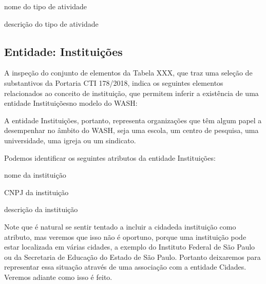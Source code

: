 \documentclass[
12pt,		%
openright,	%
twoside,  %
a4paper,			%
chapter=TITLE,		%
english,			%
french,				%
spanish,			%
brazil				%
]{USPSC-classe/USPSC}
\begin{document}
\begin{alineas}
\item nome do tipo de atividade
\item descri\c{c}\~ao do tipo de atividade
\end{alineas}

\subsection[Entidade: Institui\c{c}\~oes]{Entidade: Institui\c{c}\~oes}\label{Entidade: Institui\c{c}\~oes}
A inspe\c{c}\~ao do conjunto de elementos da Tabela XXX, que traz uma sele\c{c}\~ao de substantivos da Portaria CTI 178/2018, indica os seguintes elementos relacionados ao conceito de \textquotedbl institui\c{c}\~ao\textquotedbl , que permitem inferir a exist\^encia de uma entidade \textquotedbl Institui\c{c}\~oes\textquotedbl  no modelo do WASH:



\noindent\begin{center}\mbox{\centering{}}\end{center}


A entidade \textquotedbl Institui\c{c}\~oes\textquotedbl , portanto, representa organiza\c{c}\~oes que t\^em algum papel a desempenhar no \^ambito do WASH, seja uma escola, um centro de pesquisa, uma universidade, uma igreja ou um sindicato.


Podemos identificar os seguintes atributos da entidade \textquotedbl Institui\c{c}\~oes\textquotedbl :



\begin{alineas}
\item nome da institui\c{c}\~ao
\item CNPJ da institui\c{c}\~ao
\item descri\c{c}\~ao da institui\c{c}\~ao
\end{alineas}

Note que \'e natural se sentir tentado a incluir a \textquotedbl cidade\textquotedbl  da institui\c{c}\~ao como atributo, mas veremos que isso n\~ao \'e oportuno, porque uma institui\c{c}\~ao pode estar localizada em v\'arias cidades, a exemplo do Instituto Federal de S\~ao Paulo ou da Secretaria de Educa\c{c}\~ao do Estado de S\~ao Paulo. Portanto deixaremos para representar essa situa\c{c}\~ao atrav\'es de uma associa\c{c}\~ao com a entidade \textquotedbl Cidades\textquotedbl . Veremos adiante como isso \'e feito.
\end{document}
